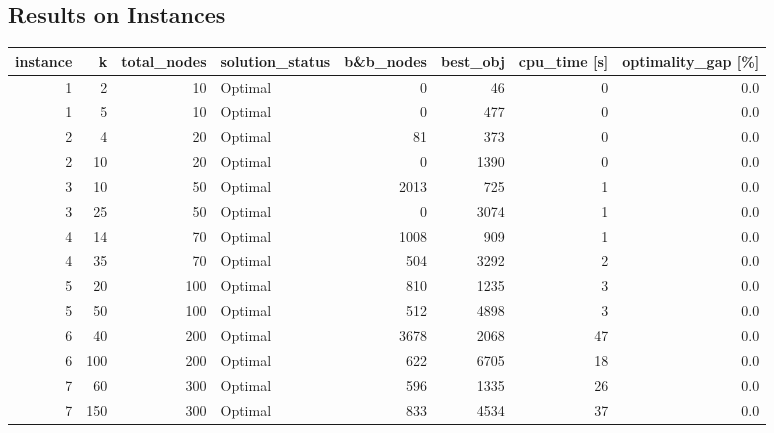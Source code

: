 \documentclass[11pt]{article}
\begin{document}
\subsection{Results on Instances}
\begin{tabular}{rrrlrrrr}
\toprule
 instance &     k &  total\_nodes & solution\_status &  b\&b\_nodes &  best\_obj &  cpu\_time [s] &  optimality\_gap [\%] \\
\midrule
        1 &     2 &           10 &         Optimal &          0 &        46 &             0 &                 0.0 \\
        1 &     5 &           10 &         Optimal &          0 &       477 &             0 &                 0.0 \\
        2 &     4 &           20 &         Optimal &         81 &       373 &             0 &                 0.0 \\
        2 &    10 &           20 &         Optimal &          0 &      1390 &             0 &                 0.0 \\
        3 &    10 &           50 &         Optimal &       2013 &       725 &             1 &                 0.0 \\
        3 &    25 &           50 &         Optimal &          0 &      3074 &             1 &                 0.0 \\
        4 &    14 &           70 &         Optimal &       1008 &       909 &             1 &                 0.0 \\
        4 &    35 &           70 &         Optimal &        504 &      3292 &             2 &                 0.0 \\
        5 &    20 &          100 &         Optimal &        810 &      1235 &             3 &                 0.0 \\
        5 &    50 &          100 &         Optimal &        512 &      4898 &             3 &                 0.0 \\
        6 &    40 &          200 &         Optimal &       3678 &      2068 &            47 &                 0.0 \\
        6 &   100 &          200 &         Optimal &        622 &      6705 &            18 &                 0.0 \\
        7 &    60 &          300 &         Optimal &        596 &      1335 &            26 &                 0.0 \\
        7 &   150 &          300 &         Optimal &        833 &      4534 &            37 &                 0.0 \\

\end{tabular}
\end{document}
